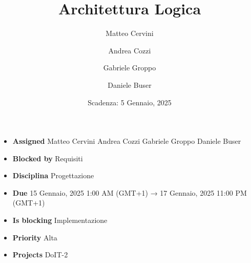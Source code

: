 \title{Architettura Logica}
\author{Matteo Cervini \and Andrea Cozzi \and Gabriele Groppo \and Daniele Buser}
\date{Scadenza: 5 Gennaio, 2025}

\maketitle

\begin{itemize}
    \item \textbf{Assigned} Matteo Cervini Andrea Cozzi Gabriele Groppo Daniele Buser
    \item \textbf{Blocked by} Requisiti
    \item \textbf{Disciplina} Progettazione
    \item \textbf{Due} 15 Gennaio, 2025 1:00 AM (GMT+1) → 17 Gennaio, 2025 11:00 PM (GMT+1)
    \item \textbf{Is blocking} Implementazione
    \item \textbf{Priority} Alta
    \item \textbf{Projects} DoIT-2
\end{itemize}